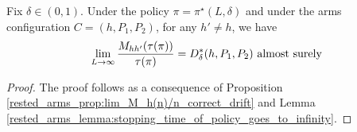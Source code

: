 \begin{lemma}\label{rested_arms_lemma:M_h(N(pi))/N(pi)_has_almost_correct_drift}
	Fix $\delta\in(0,1)$. Under the policy $\pi=\pi^{\star}(L,\delta)$ and under the  arms configuration $C=(h,P_1,P_2)$, for any $h'\neq h$, we have
	\begin{equation}
		\lim\limits_{L\to\infty}\frac{M_{hh'}(\tau(\pi))}{\tau(\pi)}=D_\delta^*(h,P_1,P_2)~\text{\text{almost surely}}\label{rested_arms_eq:M_h(N(pi))/N(pi)_has_almost_correct_drift}
	\end{equation}
\end{lemma}
\begin{proof}
The proof follows as a consequence of Proposition \ref{rested_arms_prop:lim_M_h(n)/n_correct_drift} and Lemma \ref{rested_arms_lemma:stopping_time_of_policy_goes_to_infinity}.
\end{proof}

